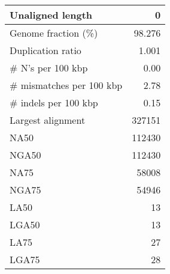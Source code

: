 \documentclass[12pt,a4paper]{article}
\begin{document}
\begin{table}[ht]
\begin{center}
\begin{tabular}{|l*{1}{|r}|}
Unaligned length & 0 \\ \hline
Genome fraction (\%) & 98.276 \\ \hline
Duplication ratio & 1.001 \\ \hline
\# N's per 100 kbp & 0.00 \\ \hline
\# mismatches per 100 kbp & 2.78 \\ \hline
\# indels per 100 kbp & 0.15 \\ \hline
Largest alignment & 327151 \\ \hline
NA50 & 112430 \\ \hline
NGA50 & 112430 \\ \hline
NA75 & 58008 \\ \hline
NGA75 & 54946 \\ \hline
LA50 & 13 \\ \hline
LGA50 & 13 \\ \hline
LA75 & 27 \\ \hline
LGA75 & 28 \\ \hline
\end{tabular}
\end{center}
\end{table}
\end{document}
